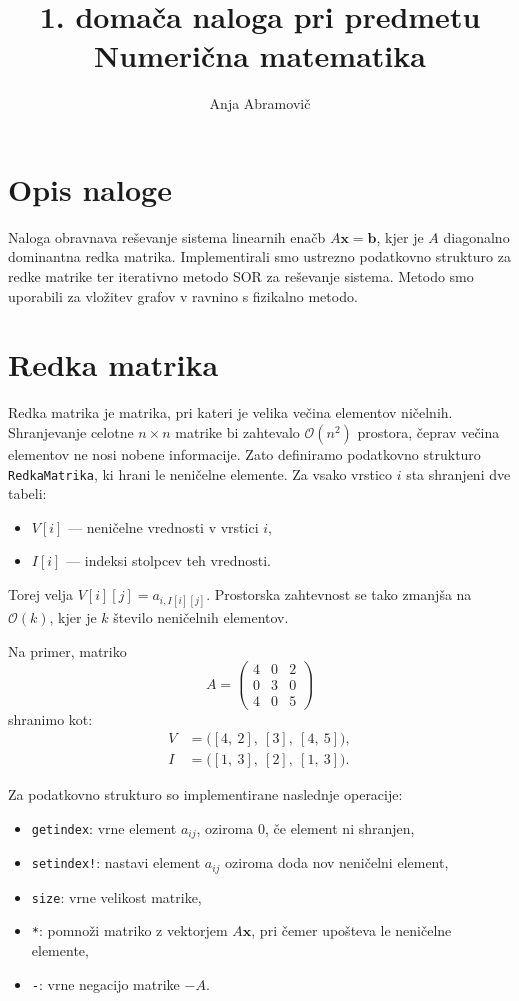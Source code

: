 \documentclass[12pt]{article}
\title{1. domača naloga pri predmetu Numerična matematika}
\author{Anja Abramovič}
\date{}
\begin{document}
\maketitle

\section{Opis naloge}
Naloga obravnava reševanje sistema linearnih enačb $A\mathbf{x} = \mathbf{b}$, kjer je $A$ diagonalno dominantna redka matrika. Implementirali smo ustrezno podatkovno strukturo za redke matrike ter iterativno metodo SOR za reševanje sistema. Metodo smo uporabili za vložitev grafov v ravnino s fizikalno metodo.

\section{Redka matrika}
Redka matrika je matrika, pri kateri je velika večina elementov ničelnih. Shranjevanje celotne $n \times n$ matrike bi zahtevalo $\mathcal{O}(n^2)$ prostora, čeprav večina elementov ne nosi nobene informacije. Zato definiramo podatkovno strukturo \texttt{RedkaMatrika}, ki hrani le neničelne elemente. Za vsako vrstico $i$ sta shranjeni dve tabeli:
\begin{itemize}
    \item $V[i]$ — neničelne vrednosti v vrstici $i$,
    \item $I[i]$ — indeksi stolpcev teh vrednosti.
\end{itemize}
Torej velja $V[i][j] = a_{i, I[i][j]}$. Prostorska zahtevnost se tako zmanjša na 
$\mathcal{O}(k)$, kjer je $k$ število neničelnih elementov.

Na primer, matriko
\begin{equation}
    A = \begin{pmatrix} 4 & 0 & 2 \\ 0 & 3 & 0 \\ 4 & 0 & 5 \end{pmatrix}
\end{equation}
shranimo kot:
\begin{align*}
    V &= \big([4,\ 2],\ [3],\ [4,\ 5]\big), \\
    I &= \big([1,\ 3],\ [2],\ [1,\ 3]\big).
\end{align*}

\noindent Za podatkovno strukturo so implementirane naslednje operacije:
\begin{itemize}
    \item \texttt{getindex}: vrne element $a_{ij}$, oziroma $0$, če element ni shranjen,
    \item \texttt{setindex!}: nastavi element $a_{ij}$ oziroma doda nov neničelni element,
    \item \texttt{size}: vrne velikost matrike,
    \item \texttt{*}: pomnoži matriko z vektorjem $A\mathbf{x}$, pri čemer upošteva le neničelne elemente,
    \item \texttt{-}: vrne negacijo matrike $-A$.
\end{itemize}
\end{document}
